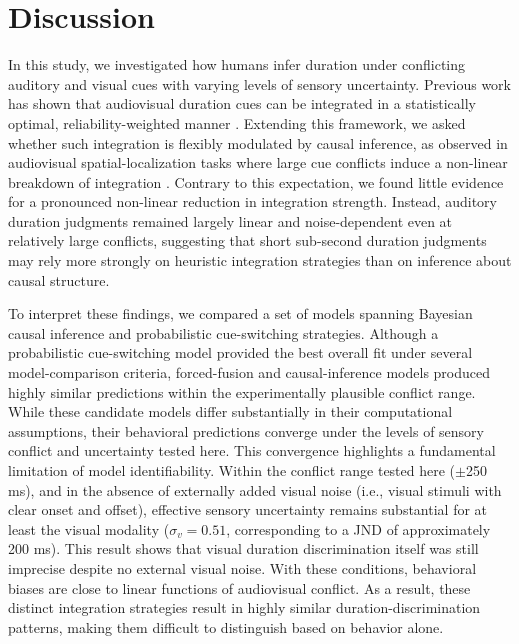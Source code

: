\documentclass{jov}
\providecommand{\citep}[1]{\cite{#1}}
\begin{document}
\section{Discussion}
In this study, we investigated how humans infer duration under conflicting auditory and visual cues with varying levels of sensory uncertainty. Previous work has shown that audiovisual duration cues can be integrated in a statistically optimal, reliability-weighted manner \citep{shams2005sound,hartcher2014duration}. Extending this framework, we asked whether such integration is flexibly modulated by causal inference, as observed in audiovisual spatial-localization tasks where large cue conflicts induce a non-linear breakdown of integration \citep{kording2007causal, badde2021causal,hong2021causal}. Contrary to this expectation, we found little evidence for a pronounced non-linear reduction in integration strength. Instead, auditory duration judgments remained largely linear and noise-dependent even at relatively large conflicts, suggesting that short sub-second duration judgments may rely more strongly on heuristic integration strategies than on inference about causal structure.
 
To interpret these findings, we compared a set of models spanning Bayesian causal inference and probabilistic cue-switching strategies. Although a probabilistic cue-switching model provided the best overall fit under several model-comparison criteria, forced-fusion and causal-inference models produced highly similar predictions within the experimentally plausible conflict range. While these candidate models differ substantially in their computational assumptions, their behavioral predictions converge under the levels of sensory conflict and uncertainty tested here. This convergence highlights a fundamental limitation of model identifiability. Within the conflict range tested here ($\pm$250 ms), and in the absence of externally added visual noise (i.e., visual stimuli with clear onset and offset), effective sensory uncertainty remains substantial for at least the visual modality ($\sigma_v = 0.51$, corresponding to a JND of approximately 200 ms). This result shows that visual duration discrimination itself was still imprecise despite no external visual noise. With these conditions, behavioral biases are close to linear functions of audiovisual conflict. As a result, these distinct integration strategies result in highly similar duration-discrimination patterns, making them difficult to distinguish based on behavior alone.
\end{document}
